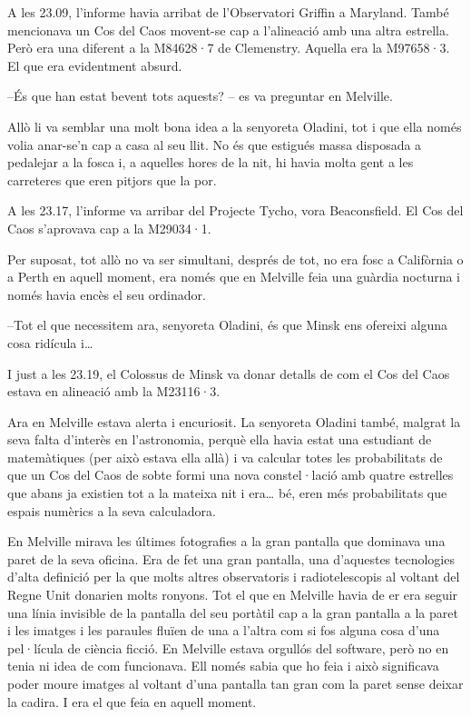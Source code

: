 A les 23.09, l'informe havia arribat de l'Observatori Griffin a
Maryland. També mencionava un Cos del Caos movent-se cap a l'alineació
amb una altra estrella. Però era una diferent a la M84628·7 de
Clemenstry. Aquella era la M97658·3. El que era evidentment absurd.

--És que han estat bevent tots aquests? -- es va preguntar en Melville.

Allò li va semblar una molt bona idea a la senyoreta Oladini, tot i que
ella només volia anar-se'n cap a casa al seu llit. No és que estigués
massa disposada a pedalejar a la fosca i, a aquelles hores de la nit, hi
havia molta gent a les carreteres que eren pitjors que la por.

A les 23.17, l'informe va arribar del Projecte Tycho, vora Beaconsfield.
El Cos del Caos s'aprovava cap a la M29034·1.

Per suposat, tot allò no va ser simultani, després de tot, no era fosc a
Califòrnia o a Perth en aquell moment, era només que en Melville feia
una guàrdia nocturna i només havia encès el seu ordinador.

--Tot el que necessitem ara, senyoreta Oladini, és que Minsk ens
ofereixi alguna cosa ridícula i\ldots{}

I just a les 23.19, el Colossus de Minsk va donar detalls de com el Cos
del Caos estava en alineació amb la M23116·3.

Ara en Melville estava alerta i encuriosit. La senyoreta Oladini també,
malgrat la seva falta d'interès en l'astronomia, perquè ella havia estat
una estudiant de matemàtiques (per això estava ella allà) i va calcular
totes les probabilitats de que un Cos del Caos de sobte formi una nova
constel·lació amb quatre estrelles que abans ja existien tot a la
mateixa nit i era\ldots{} bé, eren més probabilitats que espais numèrics
a la seva calculadora.

En Melville mirava les últimes fotografies a la gran pantalla que
dominava una paret de la seva oficina. Era de fet una gran pantalla, una
d'aquestes tecnologies d'alta definició per la que molts altres
observatoris i radiotelescopis al voltant del Regne Unit donarien molts
ronyons. Tot el que en Melville havia de er era seguir una línia
invisible de la pantalla del seu portàtil cap a la gran pantalla a la
paret i les imatges i les paraules fluïen de una a l'altra com si fos
alguna cosa d'una pel·lícula de ciència ficció. En Melville estava
orgullós del software, però no en tenia ni idea de com funcionava. Ell
només sabia que ho feia i això significava poder moure imatges al
voltant d'una pantalla tan gran com la paret sense deixar la cadira. I
era el que feia en aquell moment.

